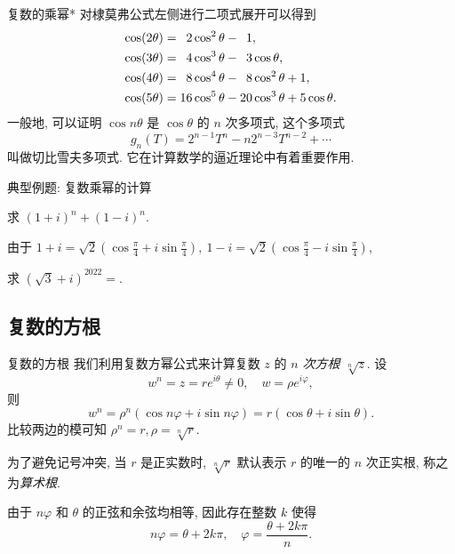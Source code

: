 \begin{frame}{复数的乘幂*}
\onslide<+->
对棣莫弗公式左侧进行二项式展开可以得到
\onslide<+->
\begin{align*}
	\cos(2\theta)&=\hphantom{1}2\cos^2\theta-\hphantom{1}1,\\
	\cos(3\theta)&=\hphantom{1}4\cos^3\theta-\hphantom{1}3\cos\theta,\\
	\cos(4\theta)&=\hphantom{1}8\cos^4\theta-\hphantom{1}8\cos^2\theta+1,\\
	\cos(5\theta)&=16\cos^5\theta-20\cos^3\theta+5\cos\theta.
\end{align*}
\onslide<+->
一般地, 可以证明 $\cos{n\theta}$ 是 $\cos\theta$ 的 $n$ 次多项式,
\onslide<+->
这个多项式
\[g_n(T)=2^{n-1}T^n-n2^{n-3}T^{n-2}+\cdots\]
叫做切比雪夫多项式.
\onslide<+->
它在计算数学的逼近理论中有着重要作用.
\end{frame}


\begin{frame}{典型例题: 复数乘幂的计算}
\onslide<+->
\begin{example}
求 $(1+i)^n+(1-i)^n$.
\end{example}
\onslide<+->
\begin{solution}
由于 $1+i=\sqrt2\left(\cos\frac\pi4+i\sin\frac\pi4\right),\ 
1-i=\sqrt2\left(\cos\frac\pi4-i\sin\frac\pi4\right)$,
\vspace{-\baselineskip}
\end{solution}
\onslide<+->
\begin{exercise}
求 $(\sqrt3+i)^{2022}=$.
\end{exercise}
\end{frame}


\subsection{复数的方根}
\begin{frame}{复数的方根}
\onslide<+->
我们利用复数方幂公式来计算复数 $z$ 的 \emph{$n$ 次方根 $\sqrt[n]z$}.
\onslide<+->
设
\[w^n=z=re^{i\theta}\neq0,\quad w=\rho e^{i\varphi},\]
\onslide<+->
则
\[w^n=\rho^n(\cos{n\varphi}+i\sin{n\varphi})=r(\cos\theta+i\sin\theta).\]
\onslide<+->
比较两边的模可知 $\rho^n=r,\rho=\sqrt[n]r$.

\onslide<+->
为了避免记号冲突, 当 $r$ 是正实数时, $\sqrt[n]r$ 默认表示 $r$ 的唯一的 $n$ 次正实根, 称之为\emph{算术根}.

\onslide<+->
由于 $n\varphi$ 和 $\theta$ 的正弦和余弦均相等, 因此存在整数 $k$ 使得
\[n\varphi=\theta+2k\pi,\quad \varphi=\frac{\theta+2k\pi}n.\]
\end{frame}


